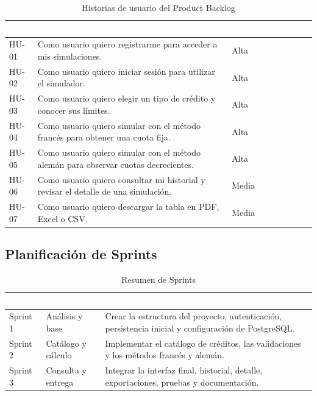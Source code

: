 \documentclass[12pt,a4paper]{article}
\begin{document}
\begin{table}[H]
\centering
\caption{Historias de usuario del Product Backlog}
\begin{tabularx}{\textwidth}{>{\centering\arraybackslash}p{1.4cm} X >{\centering\arraybackslash}p{2cm} >{\centering\arraybackslash}p{2cm}}
\toprule
\rowcolor{azulUTA}
\textcolor{white}{\textbf{ID}} & \textcolor{white}{\textbf{Historia de usuario}} & \textcolor{white}{\textbf{Prioridad}} & \textcolor{white}{\textbf{Sprint}} \\
\midrule
HU-01 & Como usuario quiero registrarme para acceder a mis simulaciones. & Alta & 1 \\
HU-02 & Como usuario quiero iniciar sesión para utilizar el simulador. & Alta & 1 \\
HU-03 & Como usuario quiero elegir un tipo de crédito y conocer sus límites. & Alta & 2 \\
HU-04 & Como usuario quiero simular con el método francés para obtener una cuota fija. & Alta & 2 \\
HU-05 & Como usuario quiero simular con el método alemán para observar cuotas decrecientes. & Alta & 2 \\
HU-06 & Como usuario quiero consultar mi historial y revisar el detalle de una simulación. & Media & 3 \\
HU-07 & Como usuario quiero descargar la tabla en PDF, Excel o CSV. & Media & 3 \\
\bottomrule
\end{tabularx}
\end{table}

\subsection{Planificación de Sprints}

\begin{table}[H]
\centering
\caption{Resumen de Sprints}
\begin{tabularx}{\textwidth}{>{\centering\arraybackslash}p{2cm} >{\centering\arraybackslash}p{3cm} X}
\toprule
\rowcolor{azulUTA}
\textcolor{white}{\textbf{Sprint}} & \textcolor{white}{\textbf{Fechas}} & \textcolor{white}{\textbf{Objetivo y entregable}} \\
\midrule
Sprint 1 & Análisis y base & Crear la estructura del proyecto, autenticación, persistencia inicial y configuración de PostgreSQL. \\
Sprint 2 & Catálogo y cálculo & Implementar el catálogo de créditos, las validaciones y los métodos francés y alemán. \\
Sprint 3 & Consulta y entrega & Integrar la interfaz final, historial, detalle, exportaciones, pruebas y documentación. \\
\bottomrule
\end{tabularx}
\end{table}
\end{document}
